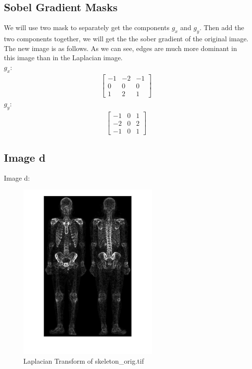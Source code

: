 \documentclass[11pt,oneside]{book}
\begin{document}
\subsection{Sobel Gradient Masks}
We will use two mask to separately get the components $g_x$ and $g_y$. Then add the two components together, we will get the the sober gradient of the original image. The new image is as follows. As we can see, edges are much more dominant in this image than in the Laplacian image.\\
$g_x$:
\begin{gather*}
  \begin{bmatrix}
    -1&-2&-1 \\ 0&0&0 \\ 1&2&1
  \end{bmatrix}
\end{gather*}
$g_y$:
\begin{gather*}
  \begin{bmatrix}
    -1&0&1 \\ -2&0&2 \\ -1&0&1
  \end{bmatrix}
\end{gather*}
\subsection{Image d}
Image d:
\begin{figure}[!htb]
   \centering  
   \includegraphics[width=0.625\textwidth]{images/2/d.jpg}
   \caption{Laplacian Transform of skeleton\_orig.tif}  
\end{figure}
\end{document}
